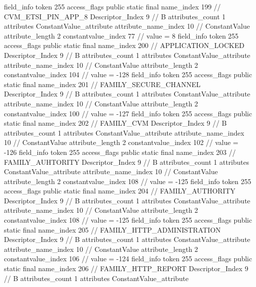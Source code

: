 {{{{{{{				}
				}
			}
			field_info {
				token	255
				access_flags	public static final
				name_index	199		// CVM_ETSI_PIN_APP_8
				Descriptor_Index	9		// B
				attributes_count	1
				attributes {
				ConstantValue_attribute {
					attribute_name_index	10		// ConstantValue
					attribute_length	2
					constantvalue_index	77		// value = 8
				}
				}
			}
			field_info {
				token	255
				access_flags	public static final
				name_index	200		// APPLICATION_LOCKED
				Descriptor_Index	9		// B
				attributes_count	1
				attributes {
				ConstantValue_attribute {
					attribute_name_index	10		// ConstantValue
					attribute_length	2
					constantvalue_index	104		// value = -128
				}
				}
			}
			field_info {
				token	255
				access_flags	public static final
				name_index	201		// FAMILY_SECURE_CHANNEL
				Descriptor_Index	9		// B
				attributes_count	1
				attributes {
				ConstantValue_attribute {
					attribute_name_index	10		// ConstantValue
					attribute_length	2
					constantvalue_index	100		// value = -127
				}
				}
			}
			field_info {
				token	255
				access_flags	public static final
				name_index	202		// FAMILY_CVM
				Descriptor_Index	9		// B
				attributes_count	1
				attributes {
				ConstantValue_attribute {
					attribute_name_index	10		// ConstantValue
					attribute_length	2
					constantvalue_index	102		// value = -126
				}
				}
			}
			field_info {
				token	255
				access_flags	public static final
				name_index	203		// FAMILY_AUHTORITY
				Descriptor_Index	9		// B
				attributes_count	1
				attributes {
				ConstantValue_attribute {
					attribute_name_index	10		// ConstantValue
					attribute_length	2
					constantvalue_index	108		// value = -125
				}
				}
			}
			field_info {
				token	255
				access_flags	public static final
				name_index	204		// FAMILY_AUTHORITY
				Descriptor_Index	9		// B
				attributes_count	1
				attributes {
				ConstantValue_attribute {
					attribute_name_index	10		// ConstantValue
					attribute_length	2
					constantvalue_index	108		// value = -125
				}
				}
			}
			field_info {
				token	255
				access_flags	public static final
				name_index	205		// FAMILY_HTTP_ADMINISTRATION
				Descriptor_Index	9		// B
				attributes_count	1
				attributes {
				ConstantValue_attribute {
					attribute_name_index	10		// ConstantValue
					attribute_length	2
					constantvalue_index	106		// value = -124
				}
				}
			}
			field_info {
				token	255
				access_flags	public static final
				name_index	206		// FAMILY_HTTP_REPORT
				Descriptor_Index	9		// B
				attributes_count	1
				attributes {
				ConstantValue_attribute {
}}}}}}}
